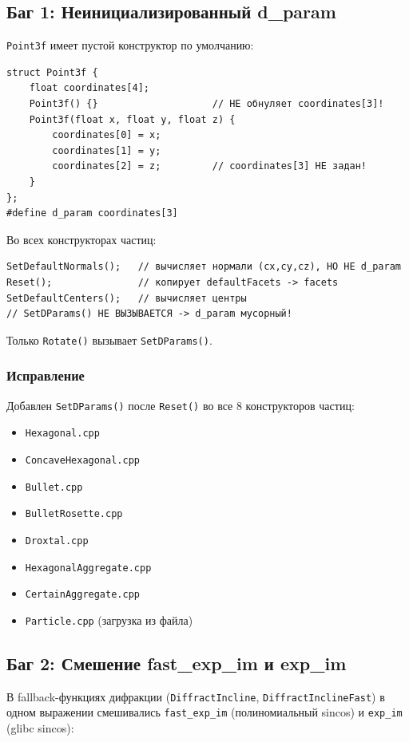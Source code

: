 \documentclass[a4paper,11pt]{article}
\begin{document}
\subsection{Баг 1: Неинициализированный d\_param}

\texttt{Point3f} имеет пустой конструктор по умолчанию:
\begin{lstlisting}
struct Point3f {
    float coordinates[4];
    Point3f() {}                    // НЕ обнуляет coordinates[3]!
    Point3f(float x, float y, float z) {
        coordinates[0] = x;
        coordinates[1] = y;
        coordinates[2] = z;         // coordinates[3] НЕ задан!
    }
};
#define d_param coordinates[3]
\end{lstlisting}

Во всех конструкторах частиц:
\begin{lstlisting}
SetDefaultNormals();   // вычисляет нормали (cx,cy,cz), НО НЕ d_param
Reset();               // копирует defaultFacets -> facets
SetDefaultCenters();   // вычисляет центры
// SetDParams() НЕ ВЫЗЫВАЕТСЯ -> d_param мусорный!
\end{lstlisting}

Только \texttt{Rotate()} вызывает \texttt{SetDParams()}.

\subsubsection*{Исправление}

Добавлен \texttt{SetDParams()} после \texttt{Reset()} во все 8 конструкторов
частиц:
\begin{itemize}
\item \texttt{Hexagonal.cpp}
\item \texttt{ConcaveHexagonal.cpp}
\item \texttt{Bullet.cpp}
\item \texttt{BulletRosette.cpp}
\item \texttt{Droxtal.cpp}
\item \texttt{HexagonalAggregate.cpp}
\item \texttt{CertainAggregate.cpp}
\item \texttt{Particle.cpp} (загрузка из файла)
\end{itemize}

\subsection{Баг 2: Смешение fast\_exp\_im и exp\_im}

В fallback-функциях дифракции (\texttt{DiffractIncline},
\texttt{DiffractInclineFast}) в одном выражении смешивались
\texttt{fast\_exp\_im} (полиномиальный sincos) и \texttt{exp\_im} (glibc sincos):
\end{document}
